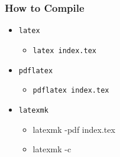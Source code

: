 \begin{frame}
\frametitle{How to Compile}
\begin{itemize}
    \item \texttt{latex}
    \begin{itemize}
      \item \texttt{latex index.tex}
    \end{itemize}
    \item \texttt{pdflatex}
    \begin{itemize}
        \item \texttt{pdflatex index.tex}
    \end{itemize}
    \item \texttt{latexmk}
    \begin{itemize}
        \item latexmk -pdf index.tex
        \item latexmk -c
    \end{itemize}
\end{itemize}
\end{frame}
